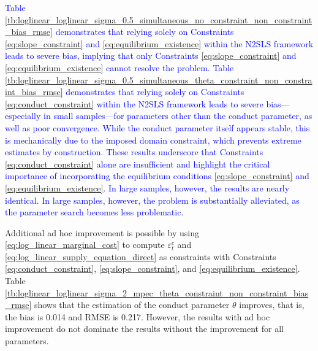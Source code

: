 \documentclass[11pt, a4paper]{article}
\theoremstyle{remark}
\begin{document}
\textcolor{blue}{
Table \ref{tb:loglinear_loglinear_sigma_0.5_simultaneous_no_constraint_non_constraint_bias_rmse} demonstrates that relying solely on Constraints \eqref{eq:slope_constraint} and \eqref{eq:equilibrium_existence} within the N2SLS framework leads to severe bias, implying that only Constraints \eqref{eq:slope_constraint} and \eqref{eq:equilibrium_existence} cannot resolve the problem. Table \ref{tb:loglinear_loglinear_sigma_0.5_simultaneous_theta_constraint_non_constraint_bias_rmse} demonstrates that relying solely on Constraints \eqref{eq:conduct_constraint} within the N2SLS framework leads to severe bias—especially in small samples—for parameters other than the conduct parameter, as well as poor convergence. While the conduct parameter itself appears stable, this is mechanically due to the imposed domain constraint, which prevents extreme estimates by construction. These results underscore that Constraints \eqref{eq:conduct_constraint} alone are insufficient and highlight the critical importance of incorporating the equilibrium conditions \eqref{eq:slope_constraint} and \eqref{eq:equilibrium_existence}. In large samples, however, the results are nearly identical. In large samples, however, the problem is substantially alleviated, as the parameter search becomes less problematic. 
}

Additional ad hoc improvement is possible by using \eqref{eq:log_linear_marginal_cost} to compute $\varepsilon_t^c$ and \eqref{eq:log_linear_supply_equation_direct} as constraints with Constraints \eqref{eq:conduct_constraint}, \eqref{eq:slope_constraint}, and \eqref{eq:equilibrium_existence}. 
Table \ref{tb:loglinear_loglinear_sigma_2_mpec_theta_constraint_non_constraint_bias_rmse} shows that the estimation of the conduct parameter $\theta$ improves, that is, the bias is 0.014 and RMSE is 0.217. 
However, the results with ad hoc improvement do not dominate the results without the improvement for all parameters.
\end{document}
